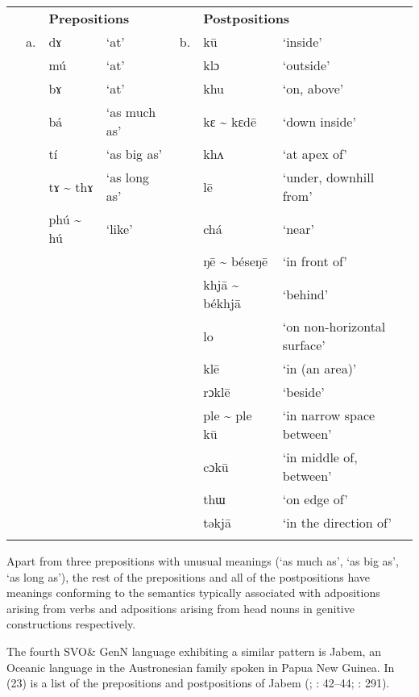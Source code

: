 \documentclass[output=paper]{langsci/langscibook}
\begin{document}
\begin{table}
\begin{tabularx}{\textwidth}{XXXXXXX} &  & \multicolumn{2}{X}{\bfseries Prepositions} &  & \multicolumn{2}{X}{\bfseries Postpositions}\\
\lsptoprule
& a. & dɤ & ‘at’ & b. & kū & ‘inside’\\
&  & mú & ‘at’ &  & klɔ & ‘outside’\\
&  & bɤ & ‘at’ &  & khu & ‘on, above’\\
&  & bá & ‘as much as’ &  & kɛ {\textasciitilde} kɛdē & ‘down inside’\\
&  & tí & ‘as big as’ &  & khʌ & ‘at apex of’\\
&  & tɤ {\textasciitilde} thɤ & ‘as long as’ &  & lē & ‘under, downhill from’\\
&  & phú {\textasciitilde} hú & ‘like’ &  & chá & ‘near’\\
&  &  &  &  & ŋē {\textasciitilde} béseŋē & ‘in front of’\\
&  &  &  &  & khjā {\textasciitilde} békhjā & ‘behind’\\
&  &  &  &  & lo & ‘on non-horizontal surface’\\
&  &  &  &  & klē & ‘in (an area)’\\
&  &  &  &  & rɔklē & ‘beside’\\
&  &  &  &  & ple {\textasciitilde} ple kū & ‘in narrow space between’\\
&  &  &  &  & cɔkū & ‘in middle of, between’\\
&  &  &  &  & thɯ & ‘on edge of’\\
&  &  &  &  & təkjā & ‘in the direction of’\\
\lspbottomrule
\end{tabularx}
\end{table}


Apart from three prepositions with unusual meanings (‘as much as’, ‘as big as’, ‘as long as’), the rest of the prepositions and all of the postpositions have meanings conforming to the semantics typically associated with adpositions arising from verbs and adpositions arising from head nouns in genitive constructions respectively.

The fourth SVO\& GenN language exhibiting a similar pattern is Jabem, an Oceanic language in the Austronesian family spoken in Papua New Guinea. In (23) is a list of the prepositions and postpositions of Jabem (\citealt{Dempwolff1939}; \citealt{BradshawCzobor2005}: 42–44; \citealt{Ross2002}: 291).
\end{document}
